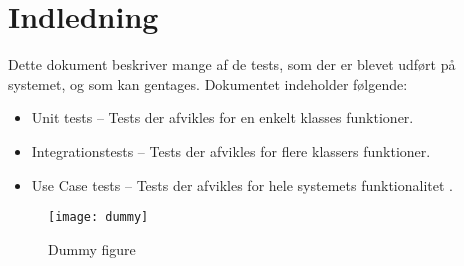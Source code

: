 \documentclass[Main]{subfiles}
\begin{document}
\chapter{Indledning}

Dette dokument beskriver mange af de tests, som der er blevet udført på systemet, og som kan gentages.
Dokumentet indeholder følgende:

\begin{itemize}
\item Unit tests -- Tests der afvikles for en enkelt klasses funktioner.
\item Integrationstests -- Tests der afvikles for flere klassers funktioner.
\item Use Case tests -- Tests der afvikles for hele systemets funktionalitet .
\end{itemize}


\begin{figure}[hbtp]
\centering
\texttt{[image: dummy]}
\caption{Dummy figure}
\label{fig:dummy}
\end{figure}
\end{document}
